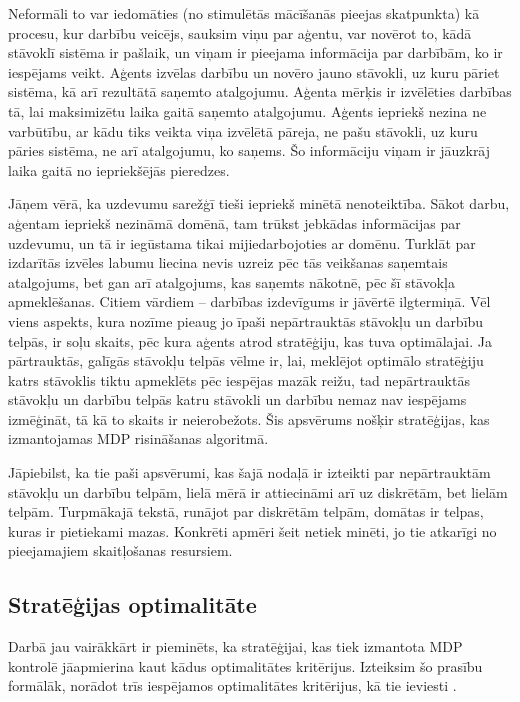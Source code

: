 \documentclass{ludis} %
\begin{document}
Neformāli to var iedomāties (no stimulētās mācīšanās pieejas skatpunkta) kā
procesu, kur darbību veicējs, sauksim viņu par aģentu, var novērot to, kādā
stāvoklī sistēma ir pašlaik, un viņam ir pieejama informācija par darbībām, ko
ir iespējams veikt. Aģents izvēlas darbību un novēro jauno stāvokli, uz kuru
pāriet sistēma, kā arī rezultātā saņemto atalgojumu. Aģenta mērķis ir izvēlēties
darbības tā, lai maksimizētu laika gaitā saņemto atalgojumu. Aģents iepriekš
nezina ne varbūtību, ar kādu tiks veikta viņa izvēlētā pāreja, ne pašu stāvokli,
uz kuru pāries sistēma, ne arī atalgojumu, ko saņems. Šo informāciju viņam ir
jāuzkrāj laika gaitā no iepriekšējās pieredzes.

Jāņem vērā, ka uzdevumu sarežģī tieši iepriekš minētā nenoteiktība. Sākot darbu,
aģentam iepriekš nezināmā domēnā, tam trūkst jebkādas informācijas par uzdevumu,
un tā ir iegūstama tikai mijiedarbojoties ar domēnu. Turklāt par izdarītās
izvēles labumu liecina nevis uzreiz pēc tās veikšanas saņemtais atalgojums, bet
gan arī atalgojums, kas saņemts nākotnē, pēc šī stāvokļa apmeklēšanas. Citiem
vārdiem -- darbības izdevīgums ir jāvērtē ilgtermiņā. Vēl viens aspekts, kura
nozīme pieaug jo īpaši nepārtrauktās stāvokļu un darbību telpās, ir soļu skaits,
pēc kura aģents atrod stratēģiju, kas tuva optimālajai. Ja pārtrauktās, galīgās
stāvokļu telpās vēlme ir, lai, meklējot optimālo stratēģiju katrs stāvoklis
tiktu apmeklēts pēc iespējas mazāk reižu, tad nepārtrauktās stāvokļu un darbību
telpās katru stāvokli un darbību nemaz nav iespējams izmēģināt, tā kā to skaits
ir neierobežots. Šis apsvērums nošķir stratēģijas, kas izmantojamas MDP
risināšanas algoritmā. %




Jāpiebilst, ka tie paši apsvērumi, kas šajā nodaļā ir izteikti par nepārtrauktām
stāvokļu un darbību telpām, lielā mērā ir attiecināmi arī uz diskrētām, bet
lielām telpām. Turpmākajā tekstā, runājot par diskrētām telpām, domātas ir
telpas, kuras ir pietiekami mazas. Konkrēti apmēri šeit netiek minēti, jo tie
atkarīgi no pieejamajiem skaitļošanas resursiem.

\subsection{Stratēģijas optimalitāte}
Darbā jau vairākkārt ir pieminēts, ka stratēģijai, kas tiek izmantota MDP
kontrolē jāapmierina kaut kādus optimalitātes kritērijus. Izteiksim šo prasību
formālāk, norādot trīs iespējamos optimalitātes kritērijus, kā tie ieviesti
\autocite{Otterlo}.
\end{document}
